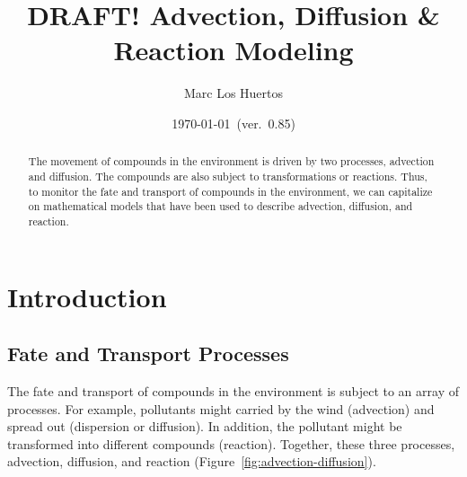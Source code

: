 \documentclass{tufte-handout}\usepackage[]{graphicx}\usepackage[]{xcolor}
\title{DRAFT! Advection, Diffusion \& Reaction Modeling}
\author{Marc Los Huertos}
\date{\today~(ver.~0.85)}
\begin{document}
\maketitle%


\begin{abstract}
The movement of compounds in the environment is driven by two processes, advection and diffusion. The compounds are also subject to transformations or reactions. Thus, to monitor the fate and transport of compounds in the environment, we can capitalize on mathematical models that have been used to describe advection, diffusion, and reaction. %

\end{abstract}



\section{Introduction}

\subsection{Fate and Transport Processes}

The fate and transport of compounds in the environment is subject to an array of processes. For example, pollutants might carried by the wind (advection) and spread out (dispersion or diffusion). In addition, the pollutant might be transformed into different compounds (reaction). Together, these three processes, advection, diffusion, and reaction (Figure~\ref{fig:advection-diffusion}).%

\end{document}
